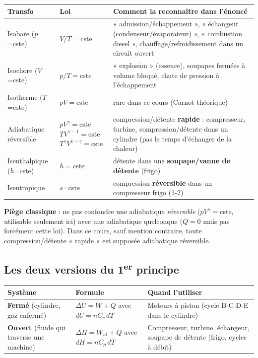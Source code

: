 \begin{center}
\renewcommand{\arraystretch}{1.4}
\begin{tabularx}{\linewidth}{@{}l l X@{}}
\toprule
\textbf{Transfo} & \textbf{Loi} & \textbf{Comment la reconnaître dans l'énoncé} \\
\midrule
Isobare ($p$=cste) & $V/T=$cste & « admission/échappement », « échangeur (condenseur/évaporateur) »,
« combustion diesel », chauffage/refroidissement dans un circuit ouvert \\
Isochore ($V$=cste) & $p/T=$cste & « explosion » (essence), soupapes fermées à volume bloqué, chute de
pression à l'échappement \\
Isotherme ($T$=cste) & $pV=$cste & rare dans ce cours (Carnot théorique) \\
Adiabatique réversible & $pV^\gamma=$cste \quad $TV^{\gamma-1}=$cste \quad $T^\gamma V^{1-\gamma}=$cste
& compression/détente \textbf{rapide} : compresseur, turbine, compression/détente dans un cylindre
(pas le temps d'échanger de la chaleur) \\
Isenthalpique ($h$=cste) & $h=$cste & détente dans une \textbf{soupape/vanne de détente} (frigo) \\
Isentropique & $s$=cste & compression \textbf{réversible} dans un compresseur frigo (1-2) \\
\bottomrule
\end{tabularx}
\end{center}

\begin{piege}
\textbf{Piège classique} : ne pas confondre une adiabatique \emph{réversible} ($pV^\gamma=$cste, utilisable
seulement ici) avec une adiabatique quelconque ($Q=0$ mais pas forcément cette loi). Dans ce cours, sauf
mention contraire, toute compression/détente « rapide » est supposée adiabatique réversible.
\end{piege}

\subsection{Les deux versions du 1\textsuperscript{er} principe}

\begin{center}
\renewcommand{\arraystretch}{1.5}
\begin{tabularx}{\linewidth}{@{}l l X@{}}
\toprule
\textbf{Système} & \textbf{Formule} & \textbf{Quand l'utiliser} \\
\midrule
\textbf{Fermé} (cylindre, gaz enfermé) & $\Delta U = W + Q$ \quad avec $dU=nC_v\,dT$ &
Moteurs à piston (cycle B-C-D-E dans le cylindre) \\
\textbf{Ouvert} (fluide qui traverse une machine) & $\Delta H = W_{ut} + Q$ \quad avec $dH=nC_p\,dT$ &
Compresseur, turbine, échangeur, soupape de détente (frigo, cycles à débit) \\
\bottomrule
\end{tabularx}
\end{center}

